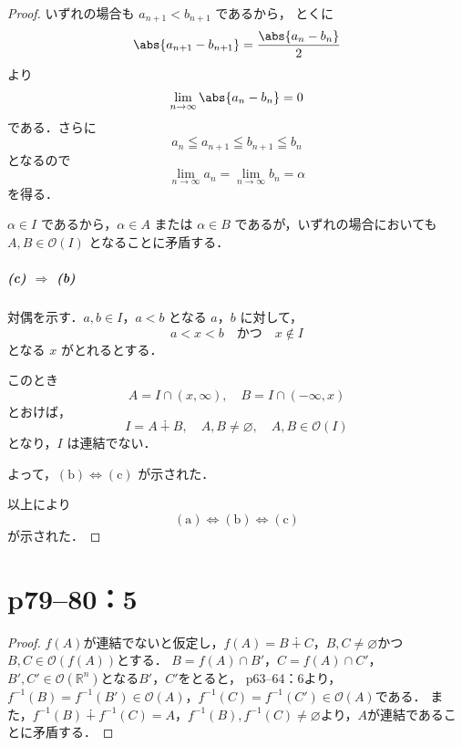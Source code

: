 \begin{leftbar}
\begin{proof}
        いずれの場合も $a_{n+1}< b_{n+1}$ であるから，
        とくに
        \[
            \abs{a_{n+1} - b_{n+1}} = \frac{\abs{a_n - b_n}}{2}
        \]
        より
        \[
            \lim_{n \to \infty} \abs{a_n - b_n} = 0
        \]
        である．さらに
        \[
            a_n \leqq a_{n+1} \leqq b_{n+1} \leqq b_n
        \]
        となるので
        \[
            \lim_{n \to \infty} a_n = \lim_{n \to \infty} b_n = \alpha
        \]
        を得る．

        $\alpha \in I$ であるから，$\alpha \in A$ または $\alpha \in B$ であるが，いずれの場合においても
        $A , B \in \mathcal{O} (I)$ となることに矛盾する．

        \subparagraph{(c) $\Longrightarrow$ (b)}
        対偶を示す．$a,b \in I$，$a < b$ となる $a$，$b$ に対して，
        \[
            a < x < b \quad \text{かつ}\quad x \notin I
        \]
        となる $x$ がとれるとする．

        このとき
        \[
            A = I \cap (x,\infty), \quad B = I \cap (-\infty,x)
        \]
        とおけば，
        \[
            I = A \dotplus B,\quad A , B \ne \varnothing,\quad A , B \in \mathcal{O} (I)
        \]
        となり，$I$ は連結でない．

        よって，$(\text{b}) \iff (\text{c})$ が示された．
        \bigskip

        以上により
        \[
            (\text{a}) \iff (\text{b}) \iff (\text{c})
        \]
        が示された．
    \end{proof}
\end{leftbar}


\section*{p79--80：5} \label{p79--80：5}

\begin{leftbar}
    \begin{proof}
        $f(A)$が連結でないと仮定し，$f(A) = B \dotplus C$，$B,C \ne \varnothing$かつ$B,C \in \mathcal{O} (f(A))$とする．
        $B = f(A) \cap B '$，$C = f(A) \cap C '$，$B ', C ' \in \mathcal{O} (\mathbb{R}^n)$となる$B'$，$C'$をとると，
        p63--64：6より，$f^{-1} (B) = f^{-1}(B') \in \mathcal{O}(A)$，$f^{-1} (C) = f^{-1}(C') \in \mathcal{O}(A)$である．
        また，$f^{-1}(B) \dotplus f^{-1}(C) =A$，$ f^{-1}(B), f^{-1}(C) \ne \varnothing$より，$A$が連結であることに矛盾する．
    \end{proof}
\end{leftbar}


